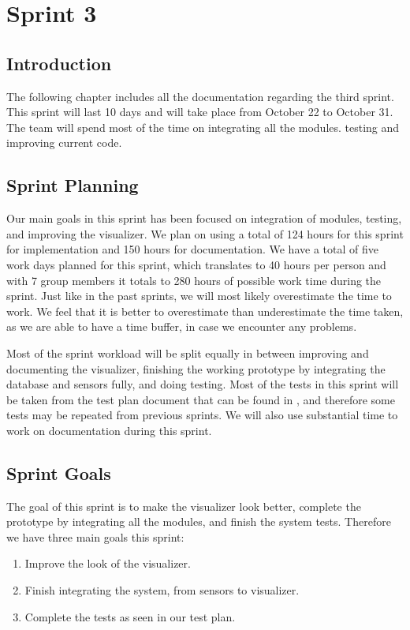 \documentclass[../document]{subfiles}
\begin{document}
\section{Sprint 3}

\subsection{Introduction}
The following chapter includes all the documentation regarding the third sprint. This sprint will last 10 days and will take place from October 22 to October 31. The team will spend most of the time on integrating all the modules. testing and improving current code.

\subsection{Sprint Planning}
Our main goals in this sprint has been focused on integration of modules, testing, and improving the visualizer. We plan on using a total of 124 hours for this sprint for implementation and 150 hours for documentation. We have a total of five work days planned for this sprint, which translates to 40 hours per person and with 7 group members it totals to 280 hours of possible work time during the sprint. Just like in the past sprints, we will most likely overestimate the time to work. We feel that it is better to overestimate than underestimate the time taken, as we are able to have a time buffer, in case we encounter any problems.

Most of the sprint workload will be split equally in between improving and documenting the visualizer, finishing the working prototype by integrating the database and sensors fully, and doing testing. Most of the tests in this sprint will be taken from the test plan document that can be found in , and therefore some tests may be repeated from previous sprints. We will also use substantial time to work on documentation during this sprint.

\subsection{Sprint Goals}
The goal of this sprint is to make the visualizer look better, complete the prototype by integrating all the modules, and finish the system tests. Therefore we have three main goals this sprint:
\begin{enumerate}
	\item
	Improve the look of the visualizer.
	\item
	Finish integrating the system, from sensors to visualizer.
	\item
	Complete the tests as seen in our test plan.
\end{enumerate}
\end{document}
